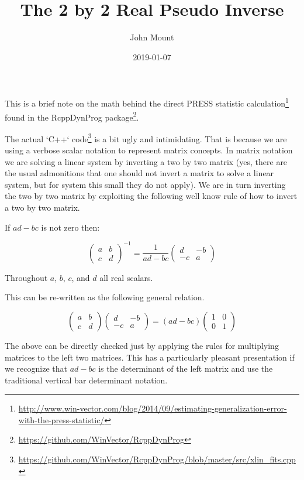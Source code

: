 \documentclass{article}
\begin{document}
\title{The 2 by 2 Real Pseudo Inverse}
\author{John Mount}
\date{2019-01-07}




\maketitle


This is a brief note on the math behind the direct
PRESS statistic calculation\footnote{\url{http://www.win-vector.com/blog/2014/09/estimating-generalization-error-with-the-press-statistic/}} 
found in the RcppDynProg package\footnote{\url{https://github.com/WinVector/RcppDynProg}}.

The actual `C++` code\footnote{\url{https://github.com/WinVector/RcppDynProg/blob/master/src/xlin_fits.cpp}} is a bit ugly and intimidating.  That is because we are using a verbose scalar notation to represent matrix concepts.  In matrix notation we are solving a linear system by inverting a two by two matrix (yes, there are the usual admonitions that one should not invert a matrix to solve a linear system, but for system this small they do not apply).  We are in turn inverting the two by two matrix by exploiting the following well know rule of how to invert a two by two matrix.


If $a d - b c$ is not zero then:

\[ 
\begin{pmatrix} a & b \\ c & d \end{pmatrix}^{-1}
=
\frac{1}{a d - b c}
\begin{pmatrix} d & -b \\ -c & a \end{pmatrix}
\]

Throughout $a$, $b$, $c$, and $d$ all real scalars.

This can be re-written as the following general relation.

\[ 
\begin{pmatrix} a & b \\ c & d \end{pmatrix}
\begin{pmatrix} d & -b \\ -c & a \end{pmatrix}
=
(a d - b c) 
\begin{pmatrix} 1 & 0 \\ 0 & 1 \end{pmatrix}
\]

The above can be directly checked just by applying the rules for multiplying matrices to the left two matrices.  This has a particularly pleasant presentation if we recognize that $a d - b c$ is  the determinant of the left matrix and use the traditional vertical bar determinant notation.
\end{document}
